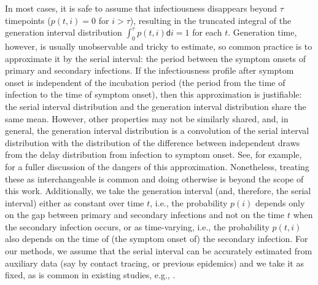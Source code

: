 \documentclass[10pt,letterpaper]{article}
\def\diff{\mathsf{d}}
\begin{document}
In most cases, it is safe to assume that infectiousness disappears beyond 
$\tau$ timepoints ($p(t,i) = 0$ for $i > \tau$), resulting in the truncated integral 
of the generation interval distribution $\int_0^\tau p(t,i)\diff i = 1$ for each $t$.
Generation time, however, is usually unobservable and tricky to estimate, so
common practice is to approximate it by the serial interval: the period between
the symptom onsets of primary and secondary infections. If the infectiousness
profile after symptom onset is independent of the incubation period (the period
from the time of infection to the time of symptom onset), then this
approximation is justifiable: the serial interval distribution and the
generation interval distribution share the same mean. However, other properties
may not be similarly shared, and, in general, the generation interval
distribution is a convolution of the serial interval distribution with the
distribution of the difference between independent draws from the delay
distribution from infection to symptom onset. See, for example,
\cite{gostic2020practical} for a fuller discussion of the dangers of this
approximation. Nonetheless, treating these as interchangeable is common
\cite{cori2013new,park2021forward} and doing otherwise is beyond the scope of this work. 
Additionally, we take the generation interval (and, therefore, the 
serial interval) either as constant over time $t$, i.e., the probability $p(i)$ 
depends only on the gap between primary and secondary infections and not on 
the time $t$ when the secondary infection occurs, or as time-varying, i.e., 
the probability $p(t,i)$ also depends on the time of (the symptom onset of)
the secondary infection. For our methods, we 
assume that the serial interval can be accurately estimated from auxiliary 
data (say by contact tracing, or previous epidemics) and we take it as 
fixed, as is common in existing studies, e.g., 
\cite{cori2013new,abry2020spatial,pascal2022nonsmooth}.
\end{document}

